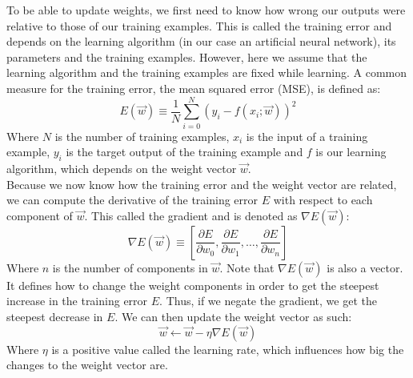 To be able to update weights, we first need to know how wrong our outputs were relative to those of our training examples.
This is called the training error and depends on the learning algorithm (in our case an artificial neural network), its parameters and the training examples. However, here we assume that the learning algorithm and the training examples are fixed while learning.
A common measure for the training error, the mean squared error (MSE), is defined as:
\begin{equation}
    E(\overrightarrow{w}) \equiv \frac{1}{N} \sum_{i=0}^N (y_i - f(x_i;\overrightarrow{w}))^2
\end{equation}
Where $N$ is the number of training examples, $x_i$ is the input of a training example, $y_i$ is the target output of the training example and $f$ is our learning algorithm, which depends on the weight vector $\overrightarrow{w}$.\\

Because we now know how the training error and the weight vector are related, we can compute the derivative of the training error $E$ with respect to each component of $\overrightarrow{w}$. This called the gradient and is denoted as $\nabla E(\overrightarrow{w})$:
\begin{equation}
    \nabla E(\overrightarrow{w}) \equiv \left [ \frac{\partial E}{\partial w_0}, \frac{\partial E}{\partial w_1}, \dots, \frac{\partial E}{\partial w_n} \right ]
\end{equation}
Where $n$ is the number of components in $\overrightarrow{w}$. Note that $\nabla E(\overrightarrow{w})$ is also a vector. It defines how to change the weight components in order to get the steepest increase in the training error $E$. Thus, if we negate the gradient, we get the steepest decrease in $E$. We can then update the weight vector as such:
\begin{equation}
    \overrightarrow{w} \gets \overrightarrow{w} - \eta \nabla E(\overrightarrow{w})
\end{equation}
Where $\eta$ is a positive value called the learning rate, which influences how big the changes to the weight vector are.\\

